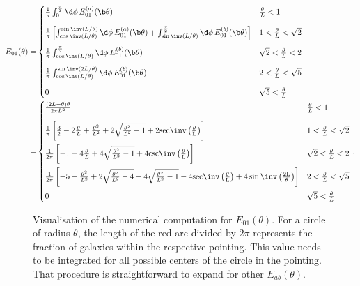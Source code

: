 {
\begingroup
\addtolength{\jot}{1em}
\begin{align}
E_{01}(\theta) = & \begin{cases}
\frac{1}{\pi}\int_0^{\frac{\pi}{2}} \d\phi\, E_{01}^{(a)}(\b\theta) & \frac{\theta}{L} < 1 \\[10pt]
 \frac{1}{\pi}  \left[\int_{\cos\inv(L/\theta)}^{\sin\inv(L/\theta)}\d\phi\,E_{01}^{(a)}(\b\theta) + \int_{\sin\inv(L/\theta)}^{\frac{\pi}{2}}\d\phi\, E_{01}^{(b)}(\b\theta) \right]  & 1 < \frac{\theta}{L} < \sqrt{2} \\[10pt]
 \frac{1}{\pi} \int_{\cos\inv(L/\theta)}^{\frac{\pi}{2}}\d\phi\, E_{01}^{(b)}(\b\theta) & \sqrt{2}<\frac{\theta}{L}<2 \\[10pt]
\frac{1}{\pi} \int_{\cos\inv(L/\theta)}^{\sin\inv(2L/\theta)}\d\phi\, E_{01}^{(b)}(\b\theta) & 2<\frac{\theta}{L}<\sqrt{5} \\[10pt]
 0 & \sqrt{5}<\frac{\theta}{L}
\end{cases}\nonumber\\
 = & \begin{cases}
 \frac{(2L-\theta)\theta}{2\pi L^2} & \frac{\theta}{L} < 1 \\[10pt]
 \frac{1}{\pi}\left[\frac{3}{2}- 2\frac{\theta}{L}+\frac{\theta^2}{L^2}+2\sqrt{\frac{\theta^2}{L^2}-1}+2\rm{sec\inv}\left(\frac{\theta}{L}\right)\right] & 1<\frac{\theta}{L}<\sqrt{2} \\[10pt]
 \frac{1}{2\pi}\left[-1-4\frac{\theta}{L}+4\sqrt{\frac{\theta^2}{L^2}-1}+4\rm{csc\inv}\left(\frac{\theta}{L}\right)\right] & \sqrt{2} < \frac{\theta}{L} < 2 \\[10pt]
 \frac{1}{2\pi}\left[-5-\frac{\theta^2}{L^2}+2\sqrt{\frac{\theta^2}{L^2}-4}+4\sqrt{\frac{\theta^2}{L^2}-1}-4\rm{sec\inv}\left(\frac{\theta}{L}\right)+4\sin\inv\left(\frac{2L}{\theta}\right)\right] & 2 < \frac{\theta}{L} < \sqrt{5} \\[10pt]
 0 & \sqrt{5}<\frac{\theta}{L}
 \end{cases}\, .
\end{align}
\endgroup
}

\begin{SCfigure}
\centering
\def\svgwidth{120pt}

\caption[Visualisation of the numerical computation for $E_{01}(\theta)$.]{Visualisation of the numerical computation for $E_{01}(\theta)$. For a circle of radius $\theta$, the length of the red arc divided by $2\pi$ represents the fraction of galaxies within the respective pointing. This value needs to be integrated for all possible centers of the circle in the pointing. That procedure is straightforward to expand for other $E_{ab}(\theta)$.}
\label{fig:eoftheta_sim}
\end{SCfigure}

